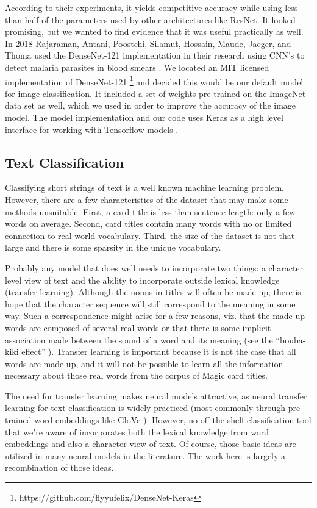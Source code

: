 \documentclass[letterpaper]{article} %
\begin{document}
According to their experiments,
it yields competitive accuracy while using less
than half of the parameters used by other architectures like ResNet.
It looked promising,
but we wanted to find evidence that it was useful practically as well.
In 2018 Rajaraman, Antani, Poostchi, Silamut, Hossain, Maude, Jaeger,
and Thoma used the DenseNet-121 implementation in their research using CNN’s
to detect malaria parasites in blood smears \cite{RajaramanSivaramakrishnan2018Pcnn}.
We located an MIT
licensed implementation of DenseNet-121
\footnote{https://github.com/flyyufelix/DenseNet-Keras}
and decided this would be our
default model for image classification.
It included a set of weights pre-trained on the ImageNet data set as well,
which we used in order to improve the accuracy of the image model.
The model implementation and our code uses Keras as a high level
interface for working with Tensorflow models \cite{chollet2015keras}.

\subsection{Text Classification}

Classifying short strings of text is a well known machine learning problem.
However,
there are a few characteristics of the dataset
that may make some methods unsuitable.
First,
a card title is less than sentence length: only a few words on average.
Second,
card titles contain many words with no or limited
connection to real world vocabulary.
Third,
the size of the dataset is not that large
and there is some sparsity in the unique vocabulary.

Probably any model that does well needs to incorporate two things:
a character level view of text
and the ability to incorporate outside lexical knowledge (transfer learning).
Although the nouns in titles will often be made-up,
there is hope that the character sequence
will still correspond to the meaning in some way.
Such a correspondence might arise for a few reasons,
viz. that the made-up words are composed of several real words
or that there is some implicit association made between the sound
of a word and its meaning
(see the ``bouba-kiki effect'' \cite{Ramachandran2001SynaesthesiaA}).
Transfer learning is important
because it is not the case that all words are made up,
and it will not be possible to learn all the information necessary
about those real words from the corpus of Magic card titles.

The need for transfer learning makes neural models attractive,
as neural transfer learning for text classification is widely practiced
(most commonly through pre-trained word embeddings
like GloVe \cite{Pennington2014GloveGV}).
However, no off-the-shelf classification tool that we're aware of
incorporates both the lexical knowledge from word embeddings
and also a character view of text.
Of course,
those basic ideas are utilized in many neural models in the literature.
The work here is largely a recombination of those ideas.
\end{document}
